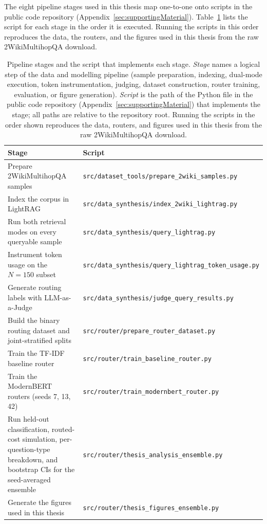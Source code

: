 \documentclass[english, bibtex]{kththesis}               %
\numberwithin{listing}{chapter}
\begin{document}
The eight pipeline stages used in this thesis map one-to-one onto scripts in the public code repository (Appendix~\ref{sec:supportingMaterial}). Table~\ref{tab:pipelineScripts} lists the script for each stage in the order it is executed. Running the scripts in this order reproduces the data, the routers, and the figures used in this thesis from the raw 2WikiMultihopQA download.

\begin{table}[!ht]
\centering
\caption{Pipeline stages and the script that implements each stage. \emph{Stage} names a logical step of the data and modelling pipeline (sample preparation, indexing, dual-mode execution, token instrumentation, judging, dataset construction, router training, evaluation, or figure generation). \emph{Script} is the path of the Python file in the public code repository (Appendix~\ref{sec:supportingMaterial}) that implements the stage; all paths are relative to the repository root. Running the scripts in the order shown reproduces the data, routers, and figures used in this thesis from the raw 2WikiMultihopQA download.}
\label{tab:pipelineScripts}
\begin{tabularx}{\textwidth}{p{}|X}
\textbf{Stage} & \textbf{Script} \\
\hline
Prepare 2WikiMultihopQA samples & \texttt{src/dataset\_tools/prepare\_2wiki\_samples.py} \\
Index the corpus in LightRAG & \texttt{src/data\_synthesis/index\_2wiki\_lightrag.py} \\
Run both retrieval modes on every queryable sample & \texttt{src/data\_synthesis/query\_lightrag.py} \\
Instrument token usage on the \(N = 150\) subset & \texttt{src/data\_synthesis/query\_lightrag\_token\_usage.py} \\
Generate routing labels with LLM-as-a-Judge & \texttt{src/data\_synthesis/judge\_query\_results.py} \\
Build the binary routing dataset and joint-stratified splits & \texttt{src/router/prepare\_router\_dataset.py} \\
Train the TF-IDF baseline router & \texttt{src/router/train\_baseline\_router.py} \\
Train the ModernBERT routers (seeds 7, 13, 42) & \texttt{src/router/train\_modernbert\_router.py} \\
Run held-out classification, routed-cost simulation, per-question-type breakdown, and bootstrap CIs for the seed-averaged ensemble & \texttt{src/router/thesis\_analysis\_ensemble.py} \\
Generate the figures used in this thesis & \texttt{src/router/thesis\_figures\_ensemble.py} \\
\end{tabularx}
\end{table}
\end{document}
